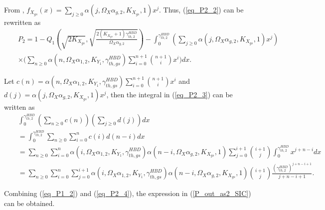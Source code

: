 From \cite{andras2011generalized}, $f_{X_{gs}}(x) = \sum_{j\geq0}\alpha(j,\Omega_X\alpha_{g,2},K_{X_{gs}},1)x^j$. Thus, (\ref{eq_P2_2}) can be rewritten as
\begin{eqnarray} \label{eq_P2_3}
&& P_2 = 1 - Q_1\left( \sqrt{2K_{X_{gs}}}, \sqrt{\frac{2(K_{X_{gs}}+1)\gamma_{th,2}^{HBD}}{\Omega_{X}\alpha_{g,2}}} \right) - \int_{0}^{\gamma_{th,2}^{HBD}} \left(\sum_{j\geq0}\alpha(j,\Omega_X\alpha_{g,2},K_{X_{gs}},1)x^j\right) \nonumber\\
&& \times \Bigg(\sum_{n\geq0}\alpha(n,\Omega_X\alpha_{1,2},K_{Y_1},\gamma_{th,gs}^{HBD})\sum_{i=0}^{n+1}\binom{n+1}{i}x^{i}\Bigg) dx.
\end{eqnarray}

Let $c(n) = \alpha(n,\Omega_X\alpha_{1,2},K_{Y_1},\gamma_{th,gs}^{HBD})\sum_{i=0}^{n+1}\binom{n+1}{i}x^{i}$ and $ d(j) = \alpha(j,\Omega_X\alpha_{g,2},K_{X_{gs}},1)x^j$, then the integral in (\ref{eq_P2_3}) can be written as \cite{andras2011generalized,bartoszewicz2012algebrability}
\begin{eqnarray} \label{eq_P2_4}
&&\int_{0}^{\gamma_{th,2}^{HBD}}\left(\sum_{n\geq0}c(n)\right)\left(\sum_{j\geq0}d(j)\right) dx\nonumber\\
&& =\int_{0}^{\gamma_{th,2}^{HBD}} \sum_{n\geq0}\sum_{i=0}^{n}c(i)d(n-i) dx \nonumber\\
&& = \sum_{n\geq0}\sum_{i=0}^{n}\alpha(i,\Omega_X\alpha_{1,2},K_{Y_1},\gamma_{th,gs}^{HBD})\alpha(n-i,\Omega_X\alpha_{g,2},K_{X_{gs}},1) \sum_{j=0}^{i+1}\binom{i+1}{j}\int_{0}^{\gamma_{th,2}^{HBD}}x^{j+n-i}dx \nonumber\\
&& = \sum_{n\geq0}\sum_{i=0}^{n}\sum_{j=0}^{i+1} \alpha(i,\Omega_X\alpha_{1,2},K_{Y_1},\gamma_{th,gs}^{HBD}) \alpha(n-i,\Omega_X\alpha_{g,2},K_{X_{gs}},1)\binom{i+1}{j}\frac{(\gamma_{th,2}^{HBD})^{j+n-i+1}}{j+n-i+1}.
\end{eqnarray}

Combining (\ref{eq_P1_2}) and (\ref{eq_P2_4}), the expression in (\ref{P_out_as2_SIC}) can be obtained.


